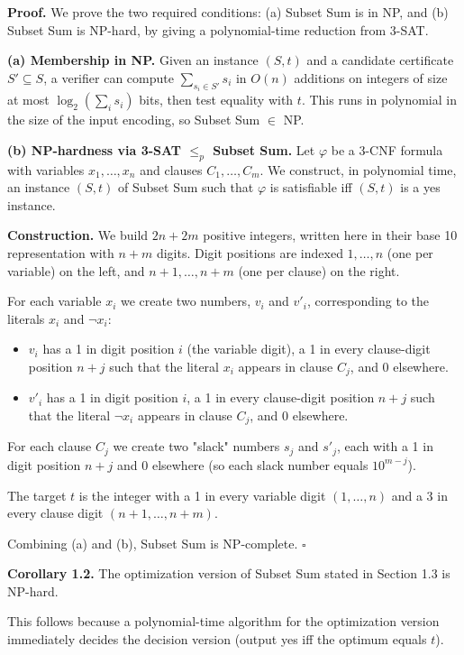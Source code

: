 \documentclass[12pt,a4paper]{article}
\begin{document}
\textbf{Proof.} We prove the two required conditions: (a) Subset Sum is in NP, and (b) Subset Sum is NP-hard, by giving a polynomial-time reduction from 3-SAT.

\textbf{(a) Membership in NP.} Given an instance $(S, t)$ and a candidate certificate $S' \subseteq S$, a verifier can compute $\sum_{s_i \in S'} s_i$ in $O(n)$ additions on integers of size at most $\log_2(\sum_i s_i)$ bits, then test equality with $t$. This runs in polynomial in the size of the input encoding, so Subset Sum $\in$ NP.

\textbf{(b) NP-hardness via 3-SAT $\leq_p$ Subset Sum.} Let $\varphi$ be a 3-CNF formula with variables $x_1, \ldots, x_n$ and clauses $C_1, \ldots, C_m$. We construct, in polynomial time, an instance $(S, t)$ of Subset Sum such that $\varphi$ is satisfiable iff $(S, t)$ is a yes instance.

\textbf{Construction.} We build $2n + 2m$ positive integers, written here in their base 10 representation with $n + m$ digits. Digit positions are indexed $1, \ldots, n$ (one per variable) on the left, and $n + 1, \ldots, n+m$ (one per clause) on the right.

For each variable $x_i$ we create two numbers, $v_i$ and $v'_i$, corresponding to the literals $x_i$ and $\neg x_i$:
\begin{itemize}
\item $v_i$ has a 1 in digit position $i$ (the variable digit), a 1 in every clause-digit position $n + j$ such that the literal $x_i$ appears in clause $C_j$, and 0 elsewhere.
\item $v'_i$ has a 1 in digit position $i$, a 1 in every clause-digit position $n + j$ such that the literal $\neg x_i$ appears in clause $C_j$, and 0 elsewhere.
\end{itemize}

For each clause $C_j$ we create two "slack" numbers $s_j$ and $s'_j$, each with a 1 in digit position $n + j$ and 0 elsewhere (so each slack number equals $10^{m-j}$).

The target $t$ is the integer with a 1 in every variable digit $(1, \ldots, n)$ and a 3 in every clause digit $(n + 1, \ldots, n + m)$.

Combining (a) and (b), Subset Sum is NP-complete. $\square$

\textbf{Corollary 1.2.} The optimization version of Subset Sum stated in Section 1.3 is NP-hard.

This follows because a polynomial-time algorithm for the optimization version immediately decides the decision version (output yes iff the optimum equals $t$).
\end{document}
